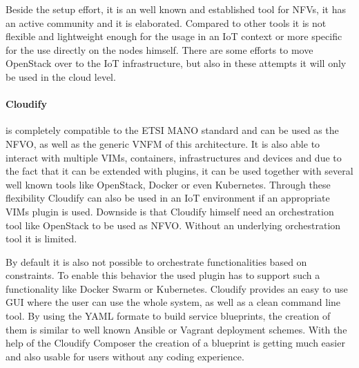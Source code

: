 Beside the setup effort, it is an well known and established tool for \acp{NFV}, it has an active community and it is elaborated.
Compared to other tools it is not flexible and lightweight enough for the usage in an \ac{IoT} context or more specific for the use directly on the nodes himself.
There are some efforts to move OpenStack over to the \ac{IoT} infrastructure\autocite{OpenStack:IoT}\autocite{OpenStack:Kubernetes:IoT}, but also in these attempts it will only be used in the cloud level.

\paragraph{Cloudify} is completely compatible to the \ac{ETSI} \ac{MANO} standard and can be used as the \ac{NFVO}, as well as the generic \ac{VNFM} of this architecture.\autocite[cf.]{Cloudify:MANO}
It is also able to interact with multiple \acp{VIM}, containers, infrastructures and devices and due to the fact that it can be extended with plugins, it can be used together with several well known tools like OpenStack, Docker or even Kubernetes.\autocite[cf.]{Cloudify:MANO}
Through these flexibility Cloudify can also be used in an \ac{IoT} environment if an appropriate \acp{VIM} plugin is used.
Downside is that Cloudify himself need an orchestration tool like OpenStack to be used as \ac{NFVO}.
Without an underlying orchestration tool it is limited.

By default it is also not possible to orchestrate functionalities based on constraints.
To enable this behavior the used plugin has to support such a functionality like Docker Swarm or Kubernetes.
Cloudify provides an easy to use \ac{GUI} where the user can use the whole system, as well as a clean command line tool.
By using the \ac{YAML} formate to build service blueprints, the creation of them is similar to well known Ansible or Vagrant deployment schemes.
With the help of the Cloudify Composer the creation of a blueprint is getting much easier and also usable for users without any coding experience.

